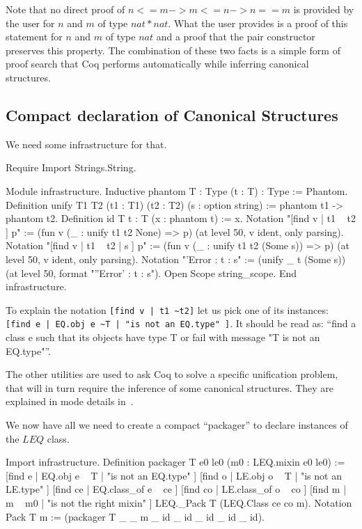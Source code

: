 Note that no direct proof of $n <= m -> m <= n -> n == m$ is provided by the
user for $n$ and $m$ of type $nat * nat$.  What the user provides is a proof of
this statement for $n$ and $m$ of type $nat$ and a proof that the pair
constructor preserves this property.  The combination of these two facts is a
simple form of proof search that Coq performs automatically while inferring
canonical structures.

\subsection{Compact declaration of Canonical Structures}

We need some infrastructure for that.

\begin{coq_example*}
Require Import Strings.String.
\end{coq_example*}
\begin{coq_example}
Module infrastructure.
  Inductive phantom {T : Type} (t : T) : Type := Phantom.
  Definition unify {T1 T2} (t1 : T1) (t2 : T2) (s : option string) :=
    phantom t1 -> phantom t2.
  Definition id {T} {t : T} (x : phantom t) := x.
  Notation "[find v | t1 ~ t2 ] p" := (fun v (_ : unify t1 t2 None) => p)
    (at level 50, v ident, only parsing).
  Notation "[find v | t1 ~ t2 | s ] p" := (fun v (_ : unify t1 t2 (Some s)) => p)
    (at level 50, v ident, only parsing).
  Notation "'Error : t : s" := (unify _ t (Some s))
    (at level 50, format "''Error'  :  t  :  s").
  Open Scope string_scope.
End infrastructure.
\end{coq_example}

To explain the notation \texttt{[find v | t1 \textasciitilde t2]} let us pick one
of its instances: \texttt{[find e | EQ.obj e \textasciitilde T | "is not an EQ.type" ]}.
It should be read as: ``find a class e such that its objects have type T
or fail with message "T is not an EQ.type"''.

The other utilities are used to ask Coq to solve a specific unification
problem, that will in turn require the inference of some canonical
structures.  They are explained in mode details in~\cite{CSwcu}.

We now have all we need to create a compact ``packager'' to declare
instances of the $LEQ$ class.

\begin{coq_example}
Import infrastructure.
Definition packager T e0 le0 (m0 : LEQ.mixin e0 le0) :=
    [find e  | EQ.obj e ~ T       | "is not an EQ.type" ]
    [find o  | LE.obj o ~ T       | "is not an LE.type" ]
    [find ce | EQ.class_of e ~ ce ]
    [find co | LE.class_of o ~ co ]
    [find m  | m ~ m0             | "is not the right mixin" ]
  LEQ._Pack T (LEQ.Class ce co m).
Notation Pack T m := (packager T _ _ m _ id _ id _ id _ id _ id).
\end{coq_example}

